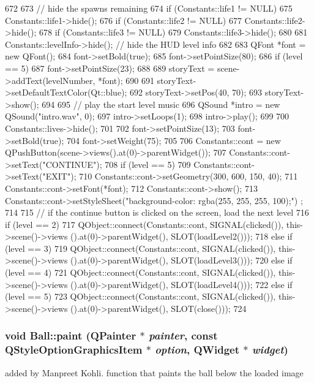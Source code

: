 \begin{DoxyCode}
672 {
673     // hide the spawns remaining
674     if (Constants::life1 != NULL)
675         Constants::life1->hide();
676     if (Constants::life2 != NULL)
677         Constants::life2->hide();
678     if (Constants::life3 != NULL)
679         Constants::life3->hide();
680 
681     Constants::levelInfo->hide();       // hide the HUD level info
682 
683     QFont *font = new QFont();
684     font->setBold(true);
685     font->setPointSize(80);
686     if (level == 5)
687         font->setPointSize(23);
688 
689     storyText = scene->addText(levelNumber, *font);
690 
691     storyText->setDefaultTextColor(Qt::blue);
692     storyText->setPos(40, 70);
693     storyText->show();
694 
695     // play the start level music
696     QSound *intro = new QSound("intro.wav", 0);
697     intro->setLoops(1);
698     intro->play();
699 
700     Constants::lives->hide();
701 
702     font->setPointSize(13);
703     font->setBold(true);
704     font->setWeight(75);
705 
706     Constants::cont = new QPushButton(scene->views().at(0)->parentWidget());
707     Constants::cont->setText("CONTINUE");
708     if (level == 5)
709         Constants::cont->setText("EXIT");
710     Constants::cont->setGeometry(300, 600, 150, 40);
711     Constants::cont->setFont(*font);
712     Constants::cont->show();
713     Constants::cont->setStyleSheet("background-color: rgba(255, 255, 255, 100);")
      ;
714 
715     // if the continue button is clicked on the screen, load the next level
716     if (level == 2)
717         QObject::connect(Constants::cont, SIGNAL(clicked()), this->scene()->views
      ().at(0)->parentWidget(), SLOT(loadLevel2()));
718     else if (level == 3)
719         QObject::connect(Constants::cont, SIGNAL(clicked()), this->scene()->views
      ().at(0)->parentWidget(), SLOT(loadLevel3()));
720     else if (level == 4)
721         QObject::connect(Constants::cont, SIGNAL(clicked()), this->scene()->views
      ().at(0)->parentWidget(), SLOT(loadLevel4()));
722     else if (level == 5)
723         QObject::connect(Constants::cont, SIGNAL(clicked()), this->scene()->views
      ().at(0)->parentWidget(), SLOT(close()));
724 }
\end{DoxyCode}
\hypertarget{class_ball_ac61500d8ef7bbb595175da04c323949c}{
\subsubsection[{paint}]{\setlength{\rightskip}{0pt plus 5cm}void Ball::paint (QPainter $\ast$ {\em painter}, \/  const QStyleOptionGraphicsItem $\ast$ {\em option}, \/  QWidget $\ast$ {\em widget})}}
\label{class_ball_ac61500d8ef7bbb595175da04c323949c}
added by Manpreet Kohli. function that paints the ball below the loaded image 

